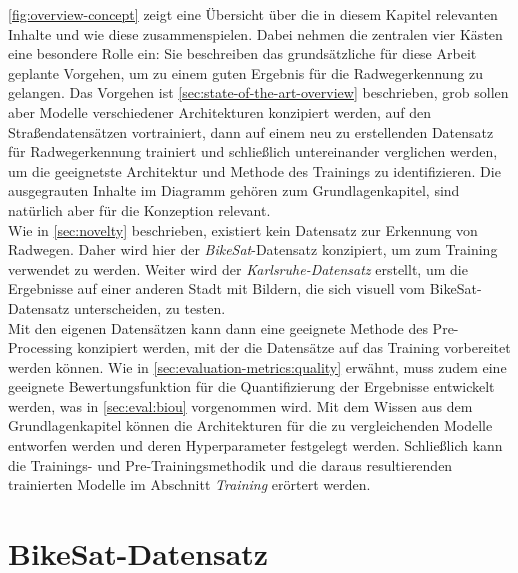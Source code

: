 \autoref{fig:overview-concept} zeigt eine Übersicht über die in diesem Kapitel relevanten Inhalte und wie diese 
zusammenspielen. Dabei nehmen die zentralen vier Kästen eine besondere Rolle ein: Sie beschreiben das grundsätzliche 
für diese Arbeit geplante Vorgehen, um zu einem guten Ergebnis für die Radwegerkennung zu gelangen. Das Vorgehen ist 
\autoref{sec:state-of-the-art-overview} beschrieben, grob sollen aber Modelle verschiedener Architekturen 
konzipiert werden, auf den Straßendatensätzen vortrainiert, dann auf einem neu zu erstellenden Datensatz für Radwegerkennung 
trainiert und schließlich untereinander verglichen werden, um die geeignetste Architektur und Methode des Trainings zu identifizieren. 
Die ausgegrauten Inhalte im Diagramm gehören zum Grundlagenkapitel, sind natürlich aber für die Konzeption relevant. \\ 
Wie in \autoref{sec:novelty} beschrieben, existiert kein Datensatz zur Erkennung von Radwegen. Daher wird hier 
der \textit{BikeSat}-Datensatz konzipiert, um zum Training verwendet zu werden. Weiter wird der \textit{Karlsruhe-Datensatz} 
erstellt, um die Ergebnisse auf einer anderen Stadt mit Bildern, die sich visuell vom BikeSat-Datensatz unterscheiden, zu testen. \\
Mit den eigenen Datensätzen kann dann eine geeignete Methode des Pre-Processing konzipiert werden, mit der die Datensätze 
auf das Training vorbereitet werden können. Wie in \autoref{sec:evaluation-metrics:quality} erwähnt, muss zudem 
eine geeignete Bewertungsfunktion für die Quantifizierung der Ergebnisse entwickelt werden, was in \autoref{sec:eval:biou} 
vorgenommen wird. Mit dem Wissen aus dem Grundlagenkapitel können die Architekturen für die zu vergleichenden Modelle entworfen werden 
und deren Hyperparameter festgelegt werden. Schließlich kann die Trainings- und Pre-Trainingsmethodik und die daraus resultierenden 
trainierten Modelle im Abschnitt \textit{Training} erörtert werden.  

\section{BikeSat-Datensatz} \label{sec:bike-data}

